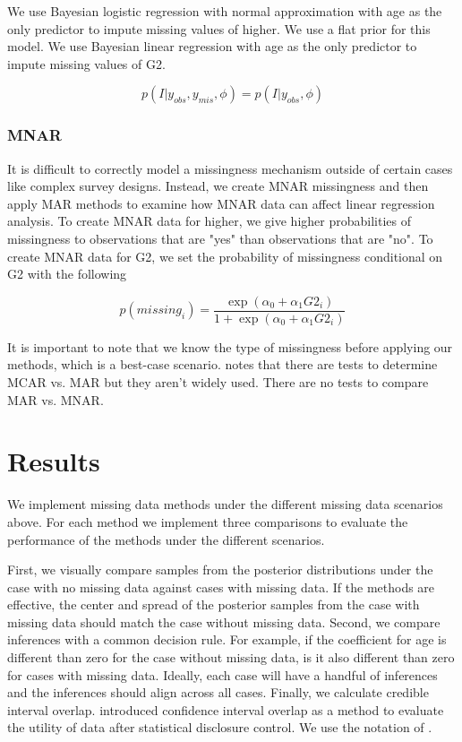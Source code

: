 \documentclass[11pt]{article}
\begin{document}
We use Bayesian logistic regression with normal approximation with age as the only predictor to impute missing values of higher. We use a flat prior for this model. We use Bayesian linear regression with age as the only predictor to impute missing values of G2. 

$$p(I|y_{obs}, y_{mis}, \phi) = p(I|y_{obs}, \phi)$$

\subsubsection{MNAR}

It is difficult to correctly model a missingness mechanism outside of certain cases like complex survey designs. Instead, we create MNAR missingness and then apply MAR methods to examine how MNAR data can affect linear regression analysis. To create MNAR data for higher, we give higher probabilities of missingness to observations that are "yes" than observations that are "no". To create MNAR data for G2, we set the probability of missingness conditional on G2 with the following

$$p(missing_i) = \frac{\exp(\alpha_0 + \alpha_1 G2_i)}{1 + \exp(\alpha_0 + \alpha_1 G2_i)}$$

It is important to note that we know the type of missingness before applying our methods, which is a best-case scenario. \cite{vanBurren2018} notes that there are tests to determine MCAR vs. MAR but they aren't widely used. There are no tests to compare MAR vs. MNAR.

\section{Results}

We implement missing data methods under the different missing data scenarios above. For each method we implement three comparisons to evaluate the performance of the methods under the different scenarios. 

First, we visually compare samples from the posterior distributions under the case with no missing data against cases with missing data. If the methods are effective, the center and spread of the posterior samples from the case with missing data should match the case without missing data. Second, we compare inferences with a common decision rule. For example, if the coefficient for age is different than zero for the case without missing data, is it also different than zero for cases with missing data. Ideally, each case will have a handful of inferences and the inferences should align across all cases. Finally, we calculate credible interval overlap. \cite{Karr2006} introduced confidence interval overlap as a method to evaluate the utility of data after statistical disclosure control. We use the notation of \cite{Snoke2018}.
\end{document}
